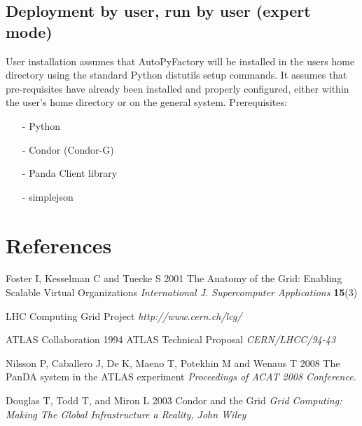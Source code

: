\documentclass[a4paper]{jpconf}
\begin{document}
\subsection{Deployment by user, run by user (expert mode)}

User installation assumes that AutoPyFactory will be installed in the users home directory using the standard Python distutils setup commands. 
It assumes that pre-requisites have already been installed and properly configured,
either within the user's home directory or on the general system.
Prerequisites: 

\begin{enumerate}
\item[-] Python 
\item[-] Condor (Condor-G) 
\item[-] Panda Client library 
\item[-] simplejson
\end{enumerate}


\section*{References}
\begin{thebibliography}{99}

\item Foster I, Kesselman C and Tuecke S 2001 The Anatomy of the Grid: Enabling Scalable Virtual Organizations
      {\it International J. Supercomputer Applications} {\bf 15}(3)

\item LHC Computing Grid Project
      {\it http://www.cern.ch/lcg/}

\item ATLAS Collaboration 1994 ATLAS Technical Proposal 
      {\it CERN/LHCC/94-43} 

\item Nilsson P, Caballero J, De K, Maeno T, Potekhin M and Wenaus T 2008 The PanDA system in the ATLAS experiment
      {\it Proceedings of ACAT 2008 Conference.}

\item Douglas T, Todd T, and Miron L 2003 Condor and the Grid
      {\it Grid Computing: Making The Global Infrastructure a Reality, John Wiley}

\end{thebibliography}
\end{document}
